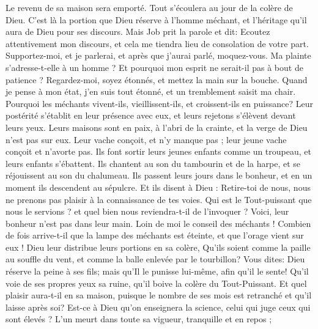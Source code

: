 \begin{multicols}{2}
Le revenu de sa maison sera emporté. Tout s'écoulera au jour de la colère de Dieu.
C'est là la portion que Dieu réserve à l'homme méchant, et l'héritage qu'il aura de Dieu pour ses discours.
\VerseOne{}Mais Job prit la parole et dit: 
Ecoutez attentivement mon discours, et cela me tiendra lieu de consolation de votre part. 
Supportez-moi, et je parlerai, et après que j'aurai parlé, moquez-vous. 
Ma plainte s'adresse-t-elle à un homme ? Et pourquoi mon esprit ne serait-il pas à bout de patience ? 
Regardez-moi, soyez étonnés, et mettez la main sur la bouche.
Quand je pense à mon état, j'en suis tout étonné, et un tremblement saisit ma chair.
Pourquoi les méchants vivent-ils, vieillissent-ils, et croissent-ils en puissance?
Leur postérité s'établit en leur présence avec eux, et leurs rejetons s'élèvent devant leurs yeux.
Leurs maisons sont en paix, à l'abri de la crainte, et la verge de Dieu n'est pas sur eux. 
Leur vache conçoit, et n'y manque pas ; leur jeune vache conçoit et n'avorte pas.
Ils font sortir leurs jeunes enfants comme un troupeau, et leurs enfants s'ébattent. 
Ils chantent au son du tambourin et de la harpe, et se réjouissent au son du chalumeau. 
Ils passent leurs jours dans le bonheur, et en un moment ils descendent au sépulcre. 
Et ils disent à Dieu : Retire-toi de nous, nous ne prenons pas plaisir à la connaissance de tes voies. 
Qui est le Tout-puissant que nous le servions ? et quel bien nous reviendra-t-il de l'invoquer ? 
Voici, leur bonheur n'est pas dans leur main. Loin de moi le conseil des méchants !
Combien de fois arrive-t-il que la lampe des méchants est éteinte, et que l'orage vient sur eux ! Dieu leur distribue leurs portions en sa colère,
Qu'ils soient comme la paille au souffle du vent, et comme la balle enlevée par le tourbillon?
Vous dites: Dieu réserve la peine à ses fils;  mais qu'Il le punisse lui-même, afin qu'il le sente! 
Qu'il voie de ses propres yeux sa ruine, qu'il boive la colère du Tout-Puissant.
Et quel plaisir aura-t-il en sa maison, puisque le nombre de ses mois est retranché et qu'il laisse après soi? 
Est-ce à Dieu qu'on enseignera la science, celui qui juge ceux qui sont élevés ?
L'un meurt dans toute sa vigueur, tranquille et en repos ; 

\end{multicols}
